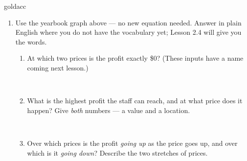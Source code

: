 \documentclass[10pt]{article}
\begin{document}
\boxguard[24]
\begin{scenariobox}{goldacc}
\small
\begin{enumerate}[leftmargin=1.6em, itemsep=6pt, topsep=2pt, start=10]

\item Use the yearbook graph above --- no new equation needed. Answer in plain English where you do
not have the vocabulary yet; Lesson 2.4 will give you the words.
\begin{enumerate}[label=(\alph*), leftmargin=1.6em, itemsep=5pt, topsep=4pt]
  \item At which two prices is the profit exactly \$0? (These inputs have a name coming next
        lesson.)

\\

  \item What is the highest profit the staff can reach, and at what price does it happen? Give
        \emph{both} numbers --- a value and a location.

\\

  \item Over which prices is the profit \emph{going up} as the price goes up, and over which is it
        \emph{going down}? Describe the two stretches of prices.

\\
\\
\end{enumerate}

\end{enumerate}
\end{scenariobox}

\vspace{0.10in}
\end{document}

